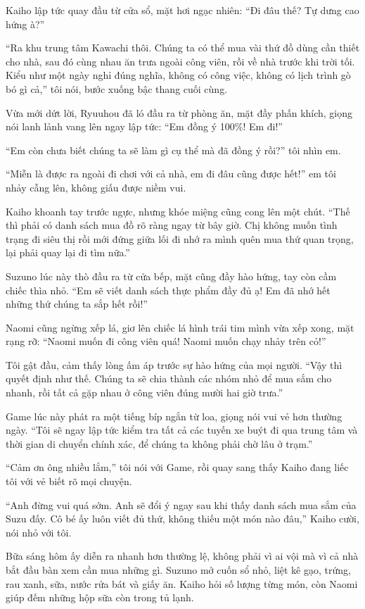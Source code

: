 ﻿\documentclass[../main.tex]{subfiles}
\begin{document}
Kaiho lập tức quay đầu từ cửa sổ, mặt hơi ngạc nhiên: ``Đi đâu thế? Tự dưng cao hứng à?''

``Ra khu trung tâm Kawachi thôi. Chúng ta có thể mua vài thứ đồ dùng cần thiết cho nhà, sau đó cùng nhau ăn trưa ngoài công viên, rồi về nhà trước khi trời tối. Kiểu như một ngày nghỉ đúng nghĩa, không có công việc, không có lịch trình gò bó gì cả,'' tôi nói, bước xuống bậc thang cuối cùng.

Vừa mới dứt lời, Ryuuhou đã ló đầu ra từ phòng ăn, mặt đầy phấn khích, giọng nói lanh lảnh vang lên ngay lập tức: ``Em đồng ý 100\%! Em đi!''

``Em còn chưa biết chúng ta sẽ làm gì cụ thể mà đã đồng ý rồi?'' tôi nhìn em.

``Miễn là được ra ngoài đi chơi với cả nhà, em đi đâu cũng được hết!'' em tôi nhảy cẫng lên, không giấu được niềm vui.

Kaiho khoanh tay trước ngực, nhưng khóe miệng cũng cong lên một chút. ``Thế thì phải có danh sách mua đồ rõ ràng ngay từ bây giờ. Chị không muốn tình trạng đi siêu thị rồi mới đứng giữa lối đi nhớ ra mình quên mua thứ quan trọng, lại phải quay lại đi tìm nữa.''

Suzuno lúc này thò đầu ra từ cửa bếp, mặt cũng đầy hào hứng, tay còn cầm chiếc thìa nhỏ. ``Em sẽ viết danh sách thực phẩm đầy đủ ạ! Em đã nhớ hết những thứ chúng ta sắp hết rồi!''

Naomi cũng ngừng xếp lá, giơ lên chiếc lá hình trái tim mình vừa xếp xong, mặt rạng rỡ: ``Naomi muốn đi công viên quá! Naomi muốn chạy nhảy trên cỏ!''

Tôi gật đầu, cảm thấy lòng ấm áp trước sự hào hứng của mọi người. ``Vậy thì quyết định như thế. Chúng ta sẽ chia thành các nhóm nhỏ để mua sắm cho nhanh, rồi tất cả gặp nhau ở công viên đúng mười hai giờ trưa.''

Game lúc này phát ra một tiếng bíp ngắn từ loa, giọng nói vui vẻ hơn thường ngày. ``Tôi sẽ ngay lập tức kiểm tra tất cả các tuyến xe buýt đi qua trung tâm và thời gian di chuyển chính xác, để chúng ta không phải chờ lâu ở trạm.''

``Cảm ơn ông nhiều lắm,'' tôi nói với Game, rồi quay sang thấy Kaiho đang liếc tôi với vẻ biết rõ mọi chuyện.

``Anh đừng vui quá sớm. Anh sẽ đổi ý ngay sau khi thấy danh sách mua sắm của Suzu đấy. Cô bé ấy luôn viết đủ thứ, không thiếu một món nào đâu,'' Kaiho cười, nói nhỏ với tôi.

\ct

Bữa sáng hôm ấy diễn ra nhanh hơn thường lệ, không phải vì ai vội mà vì cả nhà bắt đầu bàn xem cần mua những gì. Suzuno mở cuốn sổ nhỏ, liệt kê gạo, trứng, rau xanh, sữa, nước rửa bát và giấy ăn. Kaiho hỏi số lượng từng món, còn Naomi giúp đếm những hộp sữa còn trong tủ lạnh.
\end{document}
